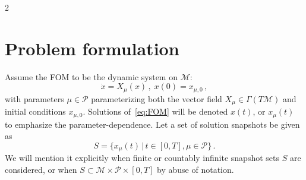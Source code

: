 \documentclass{article}
\newcommand{\M}{\mathcal{M}}                                %
\newcommand{\R}{\mathbb{R}}                                 %
\newcommand{\state}{x}
\begin{document}
\begin{multicols}{2}





\section{Problem formulation}\label{sec:problem_formulation} %
Assume the FOM to be the dynamic system on $\M$:
\begin{equation}\label{eq:FOM}
    \dot{\state} = X_\mu(\state)\,,\; \state(0) = \state_{\mu,0}\,,
\end{equation}
with parameters $\mu \in \mathcal{P}$ parameterizing both the vector field $X_\mu\in\Gamma(T\M)$ and initial conditions $\state_{\mu,0}$. Solutions of~\eqref{eq:FOM} will be denoted $\state(t)$, or $\state_\mu(t)$ to emphasize the parameter-dependence. Let a set of solution snapshots be given as
\begin{equation}\label{eq:solution-snapshots}
    S = \{\state_\mu(t) \,|\, t \in [0,T], \mu \in \mathcal{P} \}\,.
\end{equation}
We will mention it explicitly when finite or countably infinite snapshot sets $S$ are considered, or when $S \subset \M \times \mathcal{P} \times [0,T]$ by abuse of notation.


\end{multicols}
\end{document}

